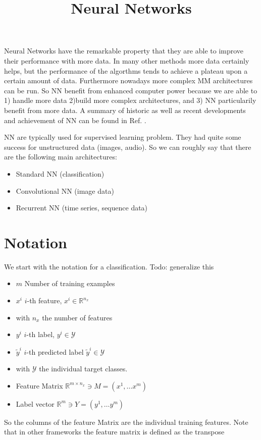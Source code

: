 \documentclass[12pt,a4paper]{article}
\begin{document}

\title{Neural Networks}
\maketitle

Neural Networks have the remarkable property that they are able to improve their performance with more data. In many other methods more data certainly helps, but the performance of the algorthms tends to achieve a plateau upon a certain amount of data. Furthermore nowadays more complex MM architectures can be run. So NN benefit from enhanced computer power because we are able to 1) handle more data 2)build more complex architectures, and 3) NN particularily benefit from more data. A summary of historic as well as recent developments and achievement of NN can be found in Ref. \cite{DBLP:journals/corr/Schmidhuber14}.

NN are typically used for supervised learning problem. They had quite some success for unstructured data (images, audio). So we can roughly say that there are the following main architectures:
\begin{itemize}	\setlength\itemsep{0em}
\item Standard NN (classification)
\item Convolutional NN (image data)
\item Recurrent NN (time series, sequence data)

\end{itemize}

\section{Notation} 
We start with the notation for a classification. Todo: generalize this
\begin{itemize}	\setlength\itemsep{0em}
\item $m$ Number of training examples
\item $x^i$ $i$-th feature, $x^i \in \mathbb R ^ {n_x}$ 
\item with $n_x$ the number of features
\item $y^i$ $i$-th label, $y^i \in \mathcal Y$
\item $\tilde y^i$ $i$-th predicted label $\tilde y^i \in \mathcal Y$
\item with $\mathcal Y$ the individual target classes.
\item Feature Matrix $\mathbb R^{m \times n_x} \ni M = \left(x^1, \dots x^m\right)  $ 
\item Label vector $\mathbb R ^m \ni Y    = (y^1, \dots y^m)$
\end{itemize}
So the columns of the feature Matrix are the individual training features. Note that in other frameworks the feature matrix is defined as the transpose
\end{document}
